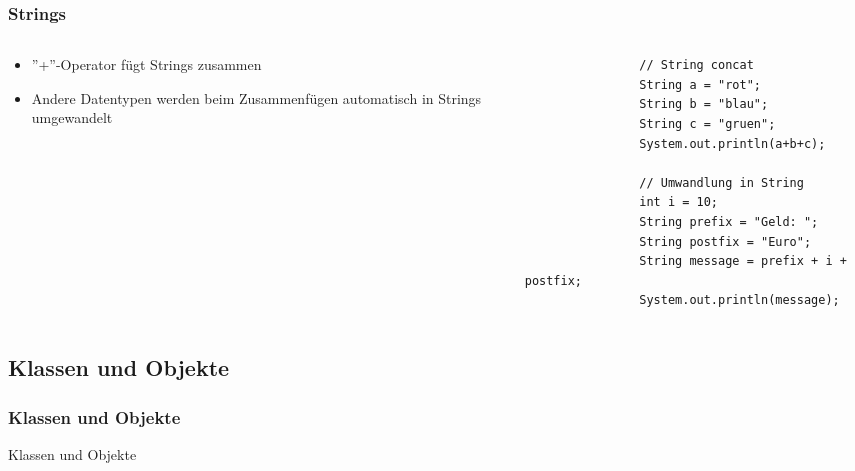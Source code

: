 \begin{frame}[fragile]
	  \frametitle{Strings}
		 \begin{columns}
		 \begin{column}{0.5\textwidth}
			  \small
			  \begin{itemize}
			    \item ''+''-Operator f\"ugt Strings zusammen
			    \item Andere Datentypen werden beim
			    Zusammenf\"ugen automatisch
			    in Strings umgewandelt
			  \end{itemize}
		 \end{column}
		 \begin{column}{0.5\textwidth}
		 	\begin{lstlisting}
		 		// String concat
		 		String a = "rot";
		 		String b = "blau";
		 		String c = "gruen";
		 		System.out.println(a+b+c);
		 		
		 		// Umwandlung in String
		 		int i = 10;
		 		String prefix = "Geld: ";
		 		String postfix = "Euro";
		 		String message = prefix + i + postfix;
		 		System.out.println(message);
		 	\end{lstlisting}
		 \end{column}
		 \end{columns}
\end{frame}



\subsection{Klassen und Objekte}
\begin{frame}[fragile]
	\frametitle{Klassen und Objekte}
	\huge Klassen und Objekte
\end{frame}

